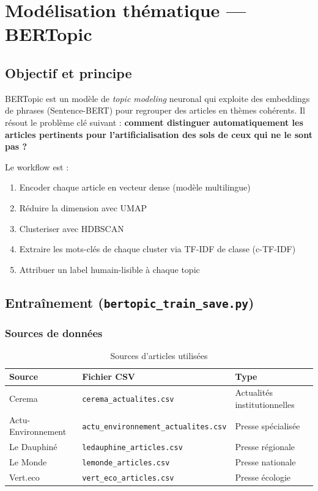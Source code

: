 \documentclass[11pt,a4paper]{report}
\newcommand{\code}[1]{\texttt{\small #1}}
\begin{document}
\section{Modélisation thématique — BERTopic}

\subsection{Objectif et principe}

BERTopic est un modèle de \textit{topic modeling} neuronal qui exploite des embeddings de phrases (Sentence-BERT) pour regrouper des articles en thèmes cohérents. Il résout le problème clé suivant : \textbf{comment distinguer automatiquement les articles pertinents pour l'artificialisation des sols de ceux qui ne le sont pas ?}

Le workflow est :
\begin{enumerate}
  \item Encoder chaque article en vecteur dense (modèle multilingue)
  \item Réduire la dimension avec UMAP
  \item Clusteriser avec HDBSCAN
  \item Extraire les mots-clés de chaque cluster via TF-IDF de classe (c-TF-IDF)
  \item Attribuer un label humain-lisible à chaque topic
\end{enumerate}

\subsection{Entraînement (\code{bertopic\_train\_save.py})}

\subsubsection{Sources de données}

\begin{table}[H]
\centering
\begin{tabular}{lll}
\toprule
\rowcolor{seuilgris!75}
\textbf{Source} & \textbf{Fichier CSV} & \textbf{Type} \\
\midrule
Cerema & \code{cerema\_actualites.csv} & Actualités institutionnelles \\
Actu-Environnement & \code{actu\_environnement\_actualites.csv} & Presse spécialisée \\
Le Dauphiné & \code{ledauphine\_articles.csv} & Presse régionale \\
Le Monde & \code{lemonde\_articles.csv} & Presse nationale \\
Vert.eco & \code{vert\_eco\_articles.csv} & Presse écologie \\
\bottomrule
\end{tabular}
\caption{Sources d'articles utilisées}
\end{table}
\end{document}
